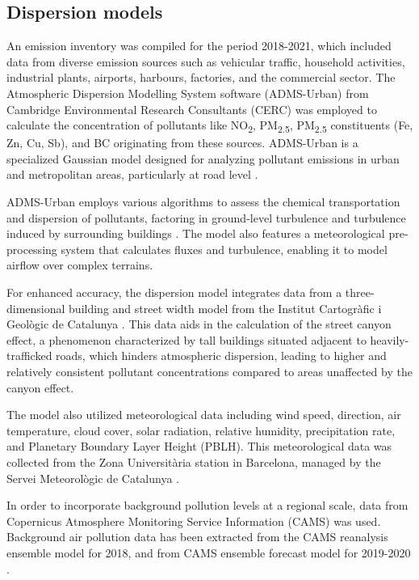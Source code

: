 \documentclass{article}
\begin{document}
\subsection{Dispersion models}

An emission inventory was compiled for the period 2018-2021, which included data from diverse emission sources such as vehicular traffic, household activities, industrial plants, airports, harbours, factories, and the commercial sector. The Atmospheric Dispersion Modelling System software (ADMS-Urban) from Cambridge Environmental Research Consultants (CERC) was employed to calculate the concentration of pollutants like NO\textsubscript{2}, PM\textsubscript{2.5}, PM\textsubscript{2.5} constituents (Fe, Zn, Cu, Sb), and BC originating from these sources. ADMS-Urban is a specialized Gaussian model designed for analyzing pollutant emissions in urban and metropolitan areas, particularly at road level \cite{mchugh1997adms}.

ADMS-Urban employs various algorithms to assess the chemical transportation and dispersion of pollutants, factoring in ground-level turbulence and turbulence induced by surrounding buildings \cite{stocker2012adms}. The model also features a meteorological pre-processing system that calculates fluxes and turbulence, enabling it to model airflow over complex terrains.

For enhanced accuracy, the dispersion model integrates data from a three-dimensional building and street width model from the Institut Cartogràfic i Geològic de Catalunya \cite{stoter2016state, 3Dcity}. This data aids in the calculation of the street canyon effect, a phenomenon characterized by tall buildings situated adjacent to heavily-trafficked roads, which hinders atmospheric dispersion, leading to higher and relatively consistent pollutant concentrations compared to areas unaffected by the canyon effect.

The model also utilized meteorological data including wind speed, direction, air temperature, cloud cover, solar radiation, relative humidity, precipitation rate, and Planetary Boundary Layer Height (PBLH). This meteorological data was collected from the Zona Universitària station in Barcelona, managed by the Servei Meteorològic de Catalunya \cite{xema2013}.

In order to incorporate background pollution levels at a regional scale, data from Copernicus Atmosphere Monitoring Service Information (CAMS) was used. Background air pollution data has been extracted from the CAMS reanalysis ensemble model for 2018, and from CAMS ensemble forecast model for 2019-2020 \cite{cams2020, franceinstitut}. 
\end{document}
